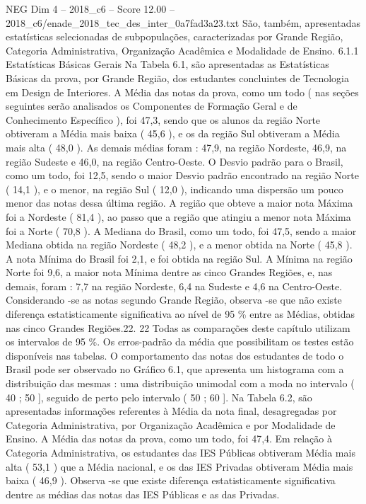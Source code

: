 \begin{textsample}{NEG Dim 4 – 2018\_c6 – Score 12.00 – 2018\_c6/enade\_2018\_tec\_des\_inter\_0a7fad3a23.txt}
São, também, apresentadas estatísticas selecionadas de subpopulações, caracterizadas por Grande Região, Categoria Administrativa, Organização Acadêmica e Modalidade de Ensino. 6.1.1 Estatísticas Básicas Gerais Na Tabela 6.1, são apresentadas as Estatísticas Básicas da prova, por Grande Região, dos estudantes concluintes de Tecnologia em Design de Interiores.
A Média das notas da prova, como um todo ( nas seções seguintes serão analisados os Componentes de Formação Geral e de Conhecimento Específico ), foi 47,3, sendo que os alunos da região Norte obtiveram a Média mais baixa ( 45,6 ), e os da região Sul obtiveram a Média mais alta ( 48,0 ).
As demais médias foram : 47,9, na região Nordeste, 46,9, na região Sudeste e 46,0, na região Centro-Oeste.
O Desvio padrão para o Brasil, como um todo, foi 12,5, sendo o maior Desvio padrão encontrado na região Norte ( 14,1 ), e o menor, na região Sul ( 12,0 ), indicando uma dispersão um pouco menor das notas dessa última região.
A região que obteve a maior nota Máxima foi a Nordeste ( 81,4 ), ao passo que a região que atingiu a menor nota Máxima foi a Norte ( 70,8 ).
A Mediana do Brasil, como um todo, foi 47,5, sendo a maior Mediana obtida na região Nordeste ( 48,2 ), e a menor obtida na Norte ( 45,8 ).
A nota Mínima do Brasil foi 2,1, e foi obtida na região Sul.
A Mínima na região Norte foi 9,6, a maior nota Mínima dentre as cinco Grandes Regiões, e, nas demais, foram : 7,7 na região Nordeste, 6,4 na Sudeste e 4,6 na Centro-Oeste.
Considerando -se as notas segundo Grande Região, observa -se que não existe diferença estatisticamente significativa ao nível de 95 \% entre as Médias, obtidas nas cinco Grandes Regiões.22. 22 Todas as comparações deste capítulo utilizam os intervalos de 95 \%.
Os erros-padrão da média que possibilitam os testes estão disponíveis nas tabelas.
O comportamento das notas dos estudantes de todo o Brasil pode ser observado no Gráfico 6.1, que apresenta um histograma com a distribuição das mesmas : uma distribuição unimodal com a moda no intervalo ( 40 ; 50 ], seguido de perto pelo intervalo ( 50 ; 60 ].
Na Tabela 6.2, são apresentadas informações referentes à Média da nota final, desagregadas por Categoria Administrativa, por Organização Acadêmica e por Modalidade de Ensino.
A Média das notas da prova, como um todo, foi 47,4.
Em relação à Categoria Administrativa, os estudantes das IES Públicas obtiveram Média mais alta ( 53,1 ) que a Média nacional, e os das IES Privadas obtiveram Média mais baixa ( 46,9 ).
Observa -se que existe diferença estatisticamente significativa dentre as médias das notas das IES Públicas e as das Privadas.

\end{textsample}
